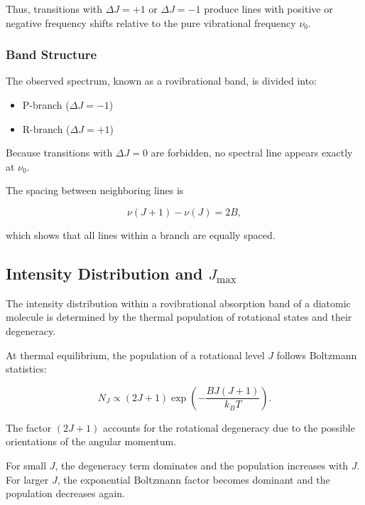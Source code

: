 Thus, transitions with $\Delta J = +1$ or $\Delta J = -1$ produce
lines with positive or negative frequency shifts relative to the
pure vibrational frequency $\nu_0$.

\subsubsection*{Band Structure}

The observed spectrum, known as a rovibrational band, is divided into:

\begin{itemize}
    \item P-branch ($\Delta J = -1$)
    \item R-branch ($\Delta J = +1$)
\end{itemize}

Because transitions with $\Delta J = 0$ are forbidden, no spectral
line appears exactly at $\nu_0$.

The spacing between neighboring lines is

\begin{equation}
\nu(J+1) - \nu(J) = 2B,
\end{equation}

which shows that all lines within a branch are equally spaced.

\subsection{Intensity Distribution and $J_{\text{max}}$} \label{Subsec: IntensityDistribution}

The intensity distribution within a rovibrational absorption band of a
diatomic molecule is determined by the thermal population of rotational
states and their degeneracy.

At thermal equilibrium, the population of a rotational level $J$ follows
Boltzmann statistics:

\begin{equation}
N_J \propto (2J+1)
\exp\left(-\frac{B J(J+1)}{k_B T}\right).
\end{equation}

The factor $(2J+1)$ accounts for the rotational degeneracy due to the
possible orientations of the angular momentum.

For small $J$, the degeneracy term dominates and the population
increases with $J$. For larger $J$, the exponential Boltzmann factor
becomes dominant and the population decreases again.

